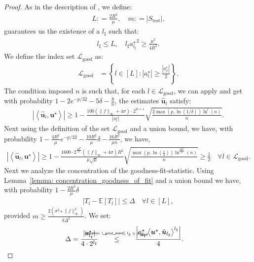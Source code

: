 \documentclass[final,12pt]{colt2018} %
\newcommand{\E}{\mathbb{E}}
\newcommand{\explain}[2]{\mathrel{\overset{\makebox[0pt]{\mbox{\normalfont\tiny\sffamily #1}}}{#2}}}
\renewcommand\v[1]{{\ensuremath{\boldsymbol{#1}}}}
\newcommand\ip[1]{\left\langle #1 \right\rangle}
\begin{document}
\begin{proof}
As in the description of , we define:
\begin{align*}
    L: = \frac{2R^2}{\mu}, \quad m: = | S_{\text{test}} |. 
\end{align*}
 guarantees us the existence of a $l_\sharp$ such that: 
\begin{align*}
    l_\sharp \leq L, \quad l_\sharp {a_{l_\sharp}^\star }^2  \geq \frac{\mu^2}{4 R^2}.
\end{align*}
We define the index set $\mathcal{L}_{\text{good}}$ as:
\begin{align*}
    \mathcal{L}_{\text{good}} & = \left\{l \in [L]: |a_l^\star| \geq \frac{|a_{l^\sharp}^\star|}{2}  \right\}.
\end{align*}
The condition imposed $n$ is such that, for each $l \in \mathcal{L}_{\text{good}}$, we can apply  and get with probability $1 - 2e^{-p/32}-5\delta - \frac{8}{n}$, the estimates $ \hat{\v u}_l$ satisfy:
\begin{align*}
    |\ip{\hat{\v u}_l, \v u^\star}| \geq 1 - \frac{100 (\|f\|_\infty + 4\sigma) \cdot 2^{2l+1}}{|a_l^\star|} \sqrt{\frac{2\max(p,\ln(1/\delta))\ln^l(n)}{n}}.
\end{align*}
Next using the definition of the set $\mathcal{L}_\text{good}$ and a union bound, we have, with probability $1-\frac{4R^2}{\mu}e^{-p/32} - \frac{10 R^2}{\mu} \delta - \frac{16 R^2}{\mu n}$, we have,
\begin{align}
    |\ip{\hat{\v u}_l, \v u^\star}| \geq 1 - \frac{1600 \cdot 2^{\frac{4R^2}{\mu}}(\|f\|_\infty + 4 \sigma)R^2}{\mu\sqrt{\mu}} \sqrt{\frac{\max\left(p,\ln \left(\frac{1}{\delta}\right)\right)\ln^{\frac{2R^2}{\mu}}(n)}{n}} \geq \frac{1}{2} \quad \forall l \in \mathcal{L}_\text{good}
    \label{equation: l_good_event}.
\end{align}
Next we analyze the concentration of the goodness-fit-statistic. Using Lemma~\ref{lemma: concentration_goodness_of_fit} and a union bound we have, with probability $1 - \frac{2R^2}{\mu} \delta$
\begin{align*}
    | T_l - \E[T_l] | \leq \Delta \quad \forall l \in [L],
\end{align*}
provided $m \geq \frac{2(\sigma^2 + \|f\|_\infty^2)}{\delta \Delta ^2}$. We set: 
\begin{align}
    \Delta = \frac{|a^\star_{l_\sharp}|}{4\cdot 2^{l_\sharp}} \qquad &\explain{\cref{equation: l_good_event}, $l_\sharp \in \mathcal{L}_\text{good}$}{\leq} \qquad \frac{\left|a^\star_{l_\sharp}\ip{\v u^\star,\hat{\v u}_{l_\sharp}}^{l_\sharp}\right|}{4}.

\end{align}
\end{proof}
\end{document}
